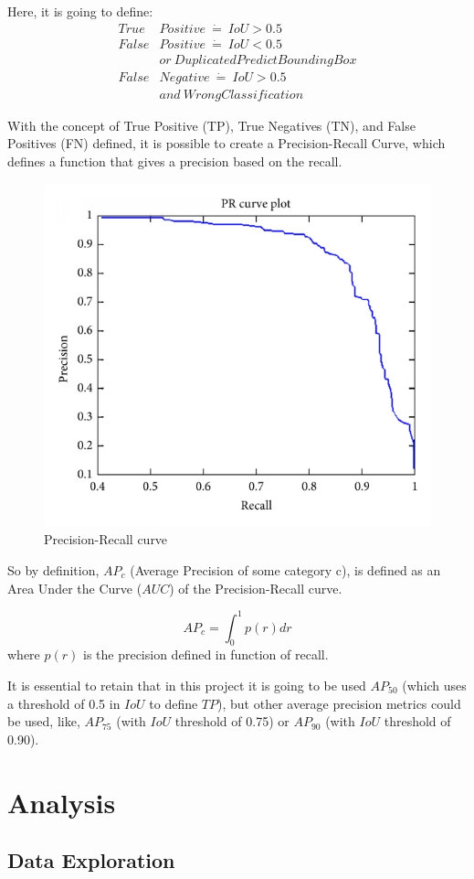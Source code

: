 \documentclass[11pt, a4paper, twocolumn]{article}
\begin{document}
Here, it is going to define:
\begin{align*}
True&Positive\ \dot=\ IoU > 0.5 \\
False&Positive\ \dot=\ IoU < 0.5 \\
&or\ DuplicatedPredictBoundingBox \\
False&Negative\ \dot=\ IoU > 0.5\ \\ 
&and \ WrongClassification
\end{align*}

With the concept of True Positive (TP), True Negatives (TN), and False Positives (FN) defined, it is possible to create a Precision-Recall Curve, which defines a function that gives a precision based on the recall.

\begin{figure}[!ht]
	
	\centering
	\includegraphics[width=.3\textwidth]{precision-recall.png}
	\caption{\scriptsize Precision-Recall curve \cite{medium:1}}
	
\end{figure}

So by definition, $AP_c$ (Average Precision of some category c), is defined as an Area Under the Curve ($AUC$) of the Precision-Recall curve.

{\centering
	\begin{equation*}
	AP_c = \int_{0}^{1} p(r) dr
	\end{equation*}
	where $p(r)$ is the precision defined in function of recall.}

It is essential to retain that in this project it is going to be used $AP_{50}$ (which uses a threshold of 0.5 in $IoU$ to define $TP$), but other average precision metrics could be used, like, $AP_{75}$ (with $IoU$ threshold of 0.75) or $AP_{90}$ (with $IoU$ threshold of 0.90).

\section{Analysis}

\subsection{Data Exploration}
\end{document}

